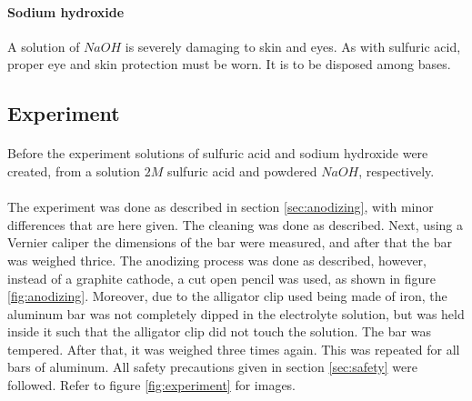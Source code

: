 \documentclass[a4paper]{article}
\begin{document}
\paragraph{Sodium hydroxide}
A solution of $NaOH$ is severely damaging to skin and eyes. As with sulfuric
acid, proper eye and skin protection must be worn. It is to be disposed among
bases.

\subsection{Experiment}

\paragraph*{}
Before the experiment solutions of sulfuric acid and sodium hydroxide were
created, from a solution $2M$ sulfuric acid and powdered $NaOH$, respectively.

\paragraph*{}
The experiment was done as described in section \ref{sec:anodizing}, with minor
differences that are here given. The cleaning was done as described. Next,
using a Vernier caliper the dimensions of the bar were measured, and after that
the bar was weighed thrice. The anodizing process was done as described,
however, instead of a graphite cathode, a cut open pencil was used, as shown in
figure \ref{fig:anodizing}. Moreover, due to the alligator clip used being made
of iron, the aluminum bar was not completely dipped in the electrolyte
solution, but was held inside it such that the alligator clip did not touch the
solution. The bar was tempered. After that, it was weighed three times again.
This was repeated for all bars of aluminum. All safety precautions given in
section \ref{sec:safety} were followed. Refer to figure \ref{fig:experiment}
for images.
\end{document}

